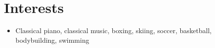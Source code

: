 \documentclass[hidelinks,letterpaper,11pt]{article} %
\newcommand{\resumeSubHeadingListStart}{\begin{itemize}[leftmargin=*]}
\newcommand{\resumeSubHeadingListEnd}{\end{itemize}}
\begin{document}
\section{Interests}
  \resumeSubHeadingListStart
      \item\small{
        {Classical piano, classical music, boxing, skiing, soccer, basketball, bodybuilding, swimming \vspace{-2pt}}
      }
  \resumeSubHeadingListEnd

%


\end{document}
